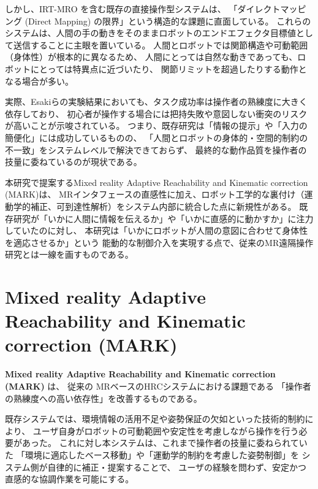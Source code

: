 \documentclass[../../main.tex]{subfiles} %
\begin{document}
しかし、IRT-MRO を含む既存の直接操作型システムは、
「ダイレクトマッピング (Direct Mapping) の限界」という構造的な課題に直面している\cite{directmapping}。%
これらのシステムは、人間の手の動きをそのままロボットのエンドエフェクタ目標値として送信することに主眼を置いている。
人間とロボットでは関節構造や可動範囲（身体性）が根本的に異なるため、
人間にとっては自然な動きであっても、ロボットにとっては特異点に近づいたり、
関節リミットを超過したりする動作となる場合が多い。

実際、Esakiらの実験結果においても、タスク成功率は操作者の熟練度に大きく依存しており、
初心者が操作する場合には把持失敗や意図しない衝突のリスクが高いことが示唆されている。
つまり、既存研究は「情報の提示」や「入力の簡便化」には成功しているものの、
「人間とロボットの身体的・空間的制約の不一致」をシステムレベルで解決できておらず、
最終的な動作品質を操作者の技量に委ねているのが現状である。

本研究で提案するMixed reality Adaptive Reachability and Kinematic correction (MARK)は、
MRインタフェースの直感性に加え、ロボット工学的な裏付け（運動学的補正、可到達性解析）をシステム内部に統合した点に新規性がある。
既存研究が「いかに人間に情報を伝えるか」や「いかに直感的に動かすか」に注力していたのに対し、
本研究は「いかにロボットが人間の意図に合わせて身体性を適応させるか」という
能動的な制御介入を実現する点で、従来のMR遠隔操作研究とは一線を画すものである。


\section{Mixed reality Adaptive Reachability and Kinematic correction (MARK)}

\textbf{Mixed reality Adaptive Reachability and Kinematic correction (MARK)} は、
従来の MRベースのHRCシステムにおける課題である
「操作者の熟練度への高い依存性」を改善するものである。

既存システムでは、環境情報の活用不足や姿勢保証の欠如といった技術的制約により、
ユーザ自身がロボットの可動範囲や安定性を考慮しながら操作を行う必要があった。
これに対し本システムは、これまで操作者の技量に委ねられていた
「環境に適応したベース移動」や「運動学的制約を考慮した姿勢制御」を
システム側が自律的に補正・提案することで、
ユーザの経験を問わず、安定かつ直感的な協調作業を可能にする。
\end{document}
